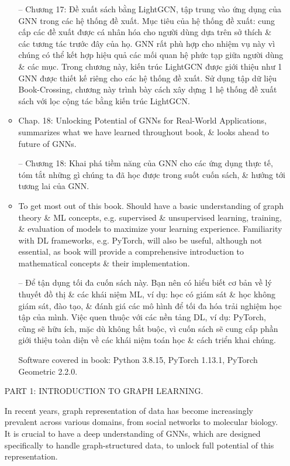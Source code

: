 \documentclass{article}
\begin{document}
\begin{itemize}
\begin{itemize}
        -- Chương 17: Đề xuất sách bằng LightGCN, tập trung vào ứng dụng của GNN trong các hệ thống đề xuất. Mục tiêu của hệ thống đề xuất: cung cấp các đề xuất được cá nhân hóa cho người dùng dựa trên sở thích \& các tương tác trước đây của họ. GNN rất phù hợp cho nhiệm vụ này vì chúng có thể kết hợp hiệu quả các mối quan hệ phức tạp giữa người dùng \& các mục. Trong chương này, kiến trúc LightGCN được giới thiệu như 1 GNN được thiết kế riêng cho các hệ thống đề xuất. Sử dụng tập dữ liệu Book-Crossing, chương này trình bày cách xây dựng 1 hệ thống đề xuất sách với lọc cộng tác bằng kiến trúc LightGCN.
        \item Chap. 18: Unlocking Potential of GNNs for Real-World Applications, summarizes what we have learned throughout book, \& looks ahead to future of GNNs.

        -- Chương 18: Khai phá tiềm năng của GNN cho các ứng dụng thực tế, tóm tắt những gì chúng ta đã học được trong suốt cuốn sách, \& hướng tới tương lai của GNN.
        \item {\sf To get most out of this book.} Should have a basic understanding of graph theory \& ML concepts, e.g. supervised \& unsupervised learning, training, \& evaluation of models to maximize your learning experience. Familiarity with DL frameworks, e.g. PyTorch, will also be useful, although not essential, as book will provide a comprehensive introduction to mathematical concepts \& their implementation.

        -- {\sf Để tận dụng tối đa cuốn sách này.} Bạn nên có hiểu biết cơ bản về lý thuyết đồ thị \& các khái niệm ML, ví dụ: học có giám sát \& học không giám sát, đào tạo, \& đánh giá các mô hình để tối đa hóa trải nghiệm học tập của mình. Việc quen thuộc với các nền tảng DL, ví dụ: PyTorch, cũng sẽ hữu ích, mặc dù không bắt buộc, vì cuốn sách sẽ cung cấp phần giới thiệu toàn diện về các khái niệm toán học \& cách triển khai chúng.

        Software covered in book: Python 3.8.15, PyTorch 1.13.1, PyTorch Geometric 2.2.0.
    \end{itemize}

    PART 1: INTRODUCTION TO GRAPH LEARNING.

    In recent years, graph representation of data has become increasingly prevalent across various domains, from social networks to molecular biology. It is crucial to have a deep understanding of GNNs, which are designed specifically to handle graph-structured data, to unlock full potential of this representation.


\end{itemize}
\end{document}
